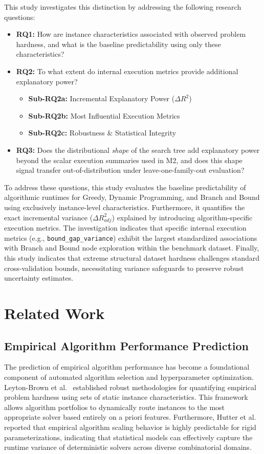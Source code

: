 \documentclass[sigconf]{acmart}
\begin{document}
This study investigates this distinction by addressing the following research questions:
\begin{itemize}
  \item \textbf{RQ1:} How are instance characteristics associated with observed problem hardness, and what is the baseline predictability using only these characteristics?
  \item \textbf{RQ2:} To what extent do internal execution metrics provide additional explanatory power?
\begin{itemize}
  \item \textbf{Sub-RQ2a:} Incremental Explanatory Power ($\Delta R^2$)
  \item \textbf{Sub-RQ2b:} Most Influential Execution Metrics
  \item \textbf{Sub-RQ2c:} Robustness \& Statistical Integrity
\end{itemize}
  \item \textbf{RQ3:} Does the distributional \emph{shape} of the search tree add explanatory power beyond the scalar execution summaries used in M2, and does this shape signal transfer out-of-distribution under leave-one-family-out evaluation?
\end{itemize}

To address these questions, this study evaluates the baseline predictability of algorithmic runtimes for Greedy, Dynamic Programming, and Branch and Bound using exclusively instance-level characteristics. Furthermore, it quantifies the exact incremental variance ($\Delta R^2_{adj}$) explained by introducing algorithm-specific execution metrics. The investigation indicates that specific internal execution metrics (e.g., \texttt{bound\_gap\_variance}) exhibit the largest standardized associations with Branch and Bound node exploration within the benchmark dataset. Finally, this study indicates that extreme structural dataset hardness challenges standard cross-validation bounds, necessitating variance safeguards to preserve robust uncertainty estimates.

\section{Related Work}

\subsection{Empirical Algorithm Performance Prediction}
The prediction of empirical algorithm performance has become a foundational component of automated algorithm selection and hyperparameter optimization. Leyton-Brown et al.~\cite{LeytonBrown2014} established robust methodologies for quantifying empirical problem hardness using sets of static instance characteristics. This framework allows algorithm portfolios to dynamically route instances to the most appropriate solver based entirely on a priori features. Furthermore, Hutter et al.~\cite{Hutter2014} reported that empirical algorithm scaling behavior is highly predictable for rigid parameterizations, indicating that statistical models can effectively capture the runtime variance of deterministic solvers across diverse combinatorial domains.
\end{document}
